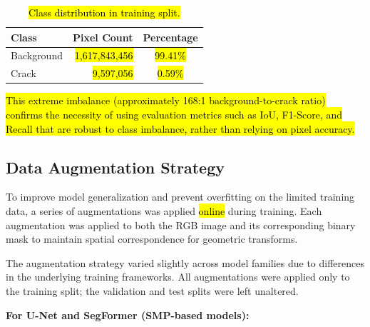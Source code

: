 \begin{table}[h]
    \centering
    \caption{\hl{Class distribution in training split.}}
    \label{tab:class_distribution}
    \renewcommand{\arraystretch}{1.1}
    \begin{tabular}{@{}l r c@{}}
        \toprule
        \textbf{Class} & \textbf{Pixel Count} & \textbf{Percentage} \\
        \midrule
        Background     & \hl{1,617,843,456}        & \hl{99.41\%}             \\
        Crack          & \hl{9,597,056}            & \hl{0.59\%}              \\
        \bottomrule
    \end{tabular}
\end{table}

\hs \hl{This extreme imbalance (approximately 168:1 background-to-crack ratio) confirms the necessity of using evaluation metrics such as IoU, F1-Score, and Recall that are robust to class imbalance, rather than relying on pixel accuracy.}

\subsection{Data Augmentation Strategy}

\hs To improve model generalization and prevent overfitting on the limited training data, a series of augmentations was applied \hl{online} during training. Each augmentation was applied to both the RGB image and its corresponding binary mask to maintain spatial correspondence for geometric transforms.

\hs The augmentation strategy varied slightly across model families due to differences in the underlying training frameworks. All augmentations were applied only to the training split; the validation and test splits were left unaltered.

\textbf{For U-Net and SegFormer (SMP-based models):}

